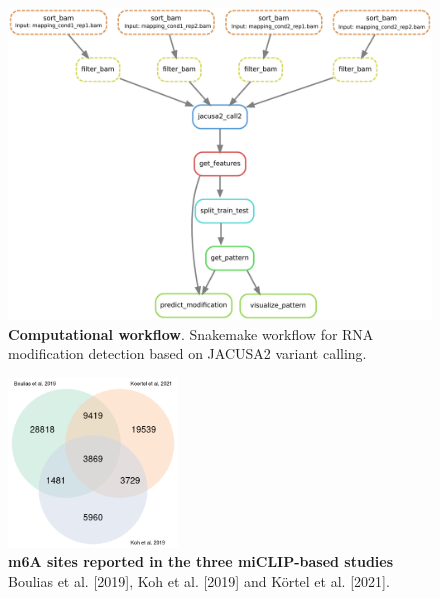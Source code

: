 \documentclass[times, 11pt, a4paper]{article}
\begin{document}
\begin{figure}[h!]
	\includegraphics[width = 1\textwidth]{img/snakemake.pdf}
	\caption{\textbf{Computational workflow}. Snakemake workflow for RNA modification detection based on JACUSA2 variant calling.}
	\label{fig:snakemake}
\end{figure}
\newpage

\begin{figure}[h!]
	\includegraphics[width = 0.4\textwidth]{img/venn_diagramm.png}
	\caption{\textbf{m6A sites reported in the three miCLIP-based studies} Boulias et al. [2019], Koh et al. [2019] and Körtel et al. [2021].}
	\label{fig:miclip_sites}
\end{figure}
\newpage
\end{document}
